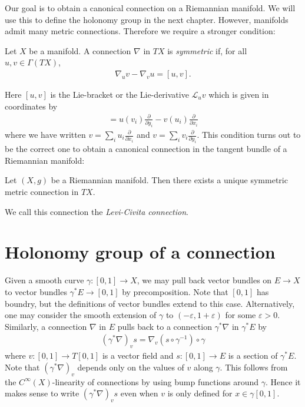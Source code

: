 \documentclass{article}
\begin{document}
Our goal is to obtain a canonical connection on a Riemannian manifold.
We will use this to define the holonomy group in the next chapter.
However, manifolds admit many metric connections. Therefore we require
a stronger condition:

\begin{definition}
  Let $X$ be a manifold. A connection $\nabla$ in $TX$ is
  \emph{symmetric} if, for all $u,v\in\Gamma(TX)$,
  \begin{align*}
    \nabla_u v - \nabla_v u = [u,v].
  \end{align*}
\end{definition}

Here $[u,v]$ is the Lie-bracket or the Lie-derivative $\mathcal L_u v$
which is given in coordinates by
\begin{align*}
  [u,v] = u(v_i)\frac{\partial }{\partial y_i} - v(u_i)\frac{\partial}{\partial x_i}
\end{align*}
where we have written $v=\sum_i u_i\frac{\partial}{\partial x_i}$
and $v=\sum_i v_i\frac{\partial}{\partial y_i}$.
This condition turns out to be the correct one to obtain a canonical connection in the tangent bundle of a Riemannian manifold:

\begin{theorem}
  Let $(X,g)$ be a Riemannian manifold. Then there exists a unique
  symmetric metric connection in $TX$.
\end{theorem}

We call this connection the \emph{Levi-Civita connection}.

\section{Holonomy group of a connection}

Given a smooth curve $\gamma:[0,1]\to X$, we may pull back vector bundles
on $E\to X$ to vector bundles $\gamma^*E\to [0,1]$ by precomposition.
Note that $[0,1]$ has boundry, but the definitions of vector bundles
extend to this case. Alternatively, one may consider the smooth extension
of $\gamma$ to $(-\varepsilon,1+\varepsilon)$ for some $\varepsilon>0$.
Similarly, a connection $\nabla$ in $E$ pulls back to a connection
$\gamma^*\nabla$ in $\gamma^* E$ by
\begin{align*}
  (\gamma^*\nabla)_v s = \nabla_v (s\circ {\gamma}^{-1})\circ\gamma
\end{align*}
where $v:[0,1]\to T[0,1]$ is a vector field and $s:[0,1]\to E$
is a section of $\gamma^* E$. Note that $(\gamma^*\nabla)_v$ depends
only on the values of $v$ along $\gamma$. This follows from the
$C^\infty(X)$-linearity of connections by using bump functions around
$\gamma$. Hence it makes sense to write $(\gamma^*\nabla)_v s$
even when $v$ is only defined for $x\in\gamma[0,1]$.
\end{document}

